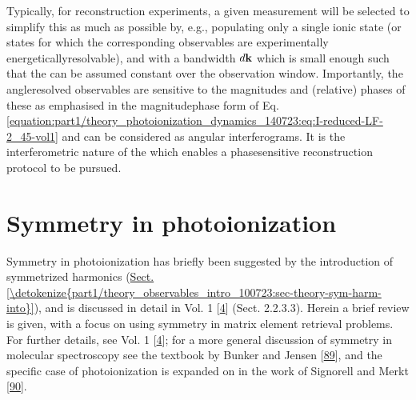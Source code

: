 \documentclass[letterpaper,table,10pt,english]{jupyterBook}
\begin{document}
\sphinxAtStartPar
Typically, for reconstruction experiments, a given measurement will be
selected to simplify this as much as possible by, e.g., populating only
a single ionic state (or states for which the corresponding observables
are experimentally energetically\sphinxhyphen{}resolvable), and with a bandwidth
\(d\bf{k}\) which is small enough such that the {\hyperref[\detokenize{backmatter/glossary:term-radial-matrix-elements}]{}} can be
assumed constant over the observation window. Importantly, the angle\sphinxhyphen{}resolved observables are
sensitive to the magnitudes and (relative) phases of these {\hyperref[\detokenize{backmatter/glossary:term-radial-matrix-elements}]{}} \sphinxhyphen{} as emphasised in the magnitude\sphinxhyphen{}phase form of Eq. \eqref{equation:part1/theory_photoionization_dynamics_140723:eq:I-reduced-LF-2_45-vol1} \sphinxhyphen{} and can be considered as angular interferograms. It is the interferometric nature of the {\hyperref[\detokenize{backmatter/glossary:term-PADs}]{}} which enables a phase\sphinxhyphen{}sensitive reconstruction protocol to be pursued.

\sphinxstepscope


\section{Symmetry in photoionization}
\label{\detokenize{part1/theory_symmetry_140723:symmetry-in-photoionization}}\label{\detokenize{part1/theory_symmetry_140723:sec-theory-symmetry-intro}}\label{\detokenize{part1/theory_symmetry_140723::doc}}
\sphinxAtStartPar
Symmetry in photoionization has briefly been suggested by the introduction of symmetrized harmonics (\hyperref[\detokenize{part1/theory_observables_intro_100723:sec-theory-sym-harm-into}]{Sect.\@ \ref{\detokenize{part1/theory_observables_intro_100723:sec-theory-sym-harm-into}}}), and is discussed in detail in  Vol. 1 {[}\hyperlink{cite.backmatter/bibliography:id675}{4}{]} (Sect. 2.2.3.3). Herein a brief review is given, with a focus on using symmetry in matrix element retrieval problems. For further details, see  Vol. 1 {[}\hyperlink{cite.backmatter/bibliography:id675}{4}{]}; for a more general discussion of symmetry in molecular spectroscopy see the textbook by  Bunker and Jensen {[}\hyperlink{cite.backmatter/bibliography:id546}{89}{]}, and the specific case of photoionization is expanded on in the work of Signorell and Merkt {[}\hyperlink{cite.backmatter/bibliography:id886}{90}{]}.
\end{document}
